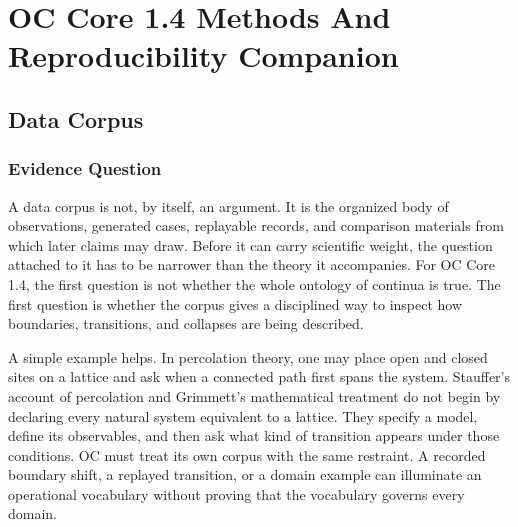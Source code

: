 \documentclass[11pt,a4paper,openany]{book}
\begin{document}
\chapter{OC Core 1.4 Methods And Reproducibility Companion}
\section{Data Corpus}
\subsection{Evidence Question}
A data corpus is not, by itself, an argument. It is the organized body of observations, generated cases, replayable records, and comparison materials from which later claims may draw. Before it can carry scientific weight, the question attached to it has to be narrower than the theory it accompanies. For OC Core 1.4, the first question is not whether the whole ontology of continua is true. The first question is whether the corpus gives a disciplined way to inspect how boundaries, transitions, and collapses are being described. \cite{stauffer_percolation,grimmett_percolation}\par
A simple example helps. In percolation theory, one may place open and closed sites on a lattice and ask when a connected path first spans the system. Stauffer's account of percolation and Grimmett's mathematical treatment do not begin by declaring every natural system equivalent to a lattice. They specify a model, define its observables, and then ask what kind of transition appears under those conditions. OC must treat its own corpus with the same restraint. A recorded boundary shift, a replayed transition, or a domain example can illuminate an operational vocabulary without proving that the vocabulary governs every domain.\par
\end{document}
